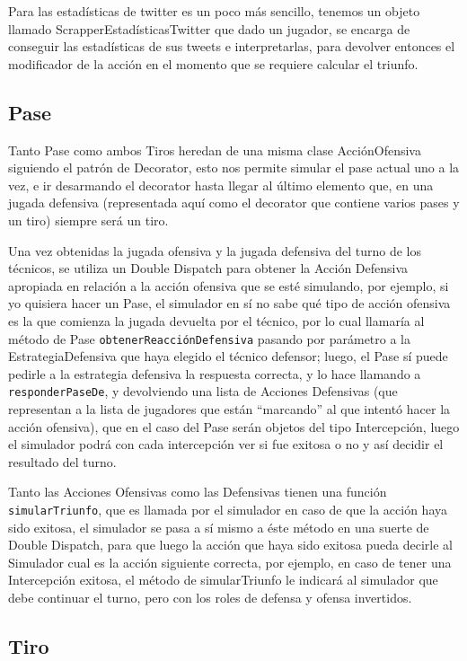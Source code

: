 Para las estadísticas de twitter es un poco más sencillo, tenemos un objeto llamado ScrapperEstadísticasTwitter que dado un jugador, se encarga de conseguir las estadísticas de sus tweets e interpretarlas, para devolver entonces el modificador de la acción en el momento que se requiere calcular el triunfo.

\subsection{Pase}

Tanto Pase como ambos Tiros heredan de una misma clase AcciónOfensiva siguiendo el patrón de Decorator, esto nos permite simular el pase actual uno a la vez, e ir desarmando el decorator hasta llegar al último elemento que, en una jugada defensiva (representada aquí como el decorator que contiene varios pases y un tiro) siempre será un tiro.

Una vez obtenidas la jugada ofensiva y la jugada defensiva del turno de los técnicos, se utiliza un Double Dispatch para obtener la Acción Defensiva apropiada en relación a la acción ofensiva que se esté simulando, por ejemplo, si yo quisiera hacer un Pase, el simulador en sí no sabe qué tipo de acción ofensiva es la que comienza la jugada devuelta por el técnico, por lo cual llamaría al método de Pase \texttt{obtenerReacciónDefensiva} pasando por parámetro a la EstrategiaDefensiva que haya elegido el técnico defensor; luego, el Pase sí puede pedirle a la estrategia defensiva la respuesta correcta, y lo hace llamando a \texttt{responderPaseDe}, y devolviendo una lista de Acciones Defensivas (que representan a la lista de jugadores que están ``marcando'' al que intentó hacer la acción ofensiva), que en el caso del Pase serán objetos del tipo Intercepción, luego el simulador podrá con cada intercepción ver si fue exitosa o no y así decidir el resultado del turno.

Tanto las Acciones Ofensivas como las Defensivas tienen una función \texttt{simularTriunfo}, que es llamada por el simulador en caso de que la acción haya sido exitosa, el simulador se pasa a sí mismo a éste método en una suerte de Double Dispatch, para que luego la acción que haya sido exitosa pueda decirle al Simulador cual es la acción siguiente correcta, por ejemplo, en caso de tener una Intercepción exitosa, el método de simularTriunfo le indicará al simulador que debe continuar el turno, pero con los roles de defensa y ofensa invertidos.


\subsection{Tiro}

